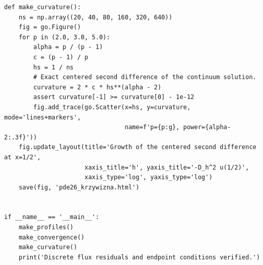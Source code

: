 \begin{lstlisting}[style=pythonpde,caption={Nieliniowy strumień, błąd aproksymacji i krzywizna (Plotly)},label={code:pde26-plotly}]
def make_curvature():
    ns = np.array((20, 40, 80, 160, 320, 640))
    fig = go.Figure()
    for p in (2.0, 3.0, 5.0):
        alpha = p / (p - 1)
        c = (p - 1) / p
        hs = 1 / ns
        # Exact centered second difference of the continuum solution.
        curvature = 2 * c * hs**(alpha - 2)
        assert curvature[-1] >= curvature[0] - 1e-12
        fig.add_trace(go.Scatter(x=hs, y=curvature, mode='lines+markers',
                                 name=f'p={p:g}, power={alpha-2:.3f}'))
    fig.update_layout(title='Growth of the centered second difference at x=1/2',
                      xaxis_title='h', yaxis_title='-D_h^2 u(1/2)',
                      xaxis_type='log', yaxis_type='log')
    save(fig, 'pde26_krzywizna.html')


if __name__ == '__main__':
    make_profiles()
    make_convergence()
    make_curvature()
    print('Discrete flux residuals and endpoint conditions verified.')
\end{lstlisting}


